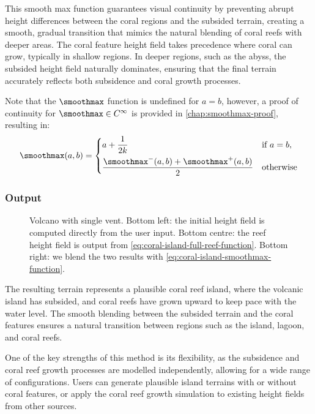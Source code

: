 This smooth max function guarantees visual continuity by preventing abrupt height differences between the coral regions and the subsided terrain, creating a smooth, gradual transition that mimics the natural blending of coral reefs with deeper areas. The coral feature height field takes precedence where coral can grow, typically in shallow regions. In deeper regions, such as the abyss, the subsided height field naturally dominates, ensuring that the final terrain accurately reflects both subsidence and coral growth processes.

Note that the $\smoothmax$ function is undefined for $a = b$, however, a proof of continuity for $\smoothmax \in C^\infty$ is provided in \cref{chap:smoothmax-proof}, resulting in:
\begin{align}
\label{eq:coral-island-smoothmax-function}
\smoothmax(a, b) = \begin{dcases}
a + \frac{1}{2k} & \text{if } a = b, \\
\frac{\smoothmax^-(a, b) + \smoothmax^+(a, b)}{2} & \text{otherwise}
\end{dcases}
\end{align}

\subsubsection{Output}
\label{sec:coral-island-procedural-output}

\begin{figure}
\caption{Volcano with single vent. Bottom left: the initial height field is computed directly from the user input. Bottom centre: the reef height field is output from \cref{eq:coral-island-full-reef-function}. Bottom right: we blend the two results with \cref{eq:coral-island-smoothmax-function}.}
\label{fig:coral-island-volcano-example}
\end{figure}

The resulting terrain represents a plausible coral reef island, where the volcanic island has subsided, and coral reefs have grown upward to keep pace with the water level. The smooth blending between the subsided terrain and the coral features ensures a natural transition between regions such as the island, lagoon, and coral reefs.

One of the key strengths of this method is its flexibility, as the subsidence and coral reef growth processes are modelled independently, allowing for a wide range of configurations. Users can generate plausible island terrains with or without coral features, or apply the coral reef growth simulation to existing height fields from other sources.


